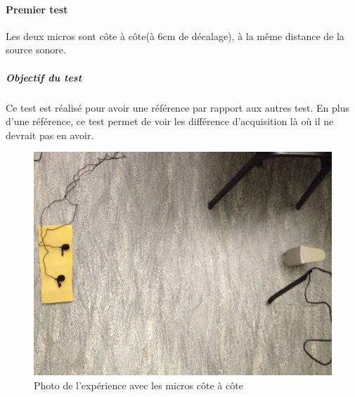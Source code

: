  \paragraph{Premier test} 
 Les deux micros sont côte à côte(à 6cm de décalage), à la même distance de la source sonore.
 \subparagraph{Objectif du test}
 Ce test est réalisé pour avoir une référence par rapport aux autres test. En plus d'une référence, ce test permet de voir les différence d'acquisition là où il ne devrait pas en avoir.
 \begin{figure}[H]
 \includegraphics[width=\textwidth]{../tests/lecture_de_signaux_carres/donnees11-03/test_1.jpg} 
 \caption{Photo de l'expérience avec les micros côte à côte}
 \end{figure}
 	
